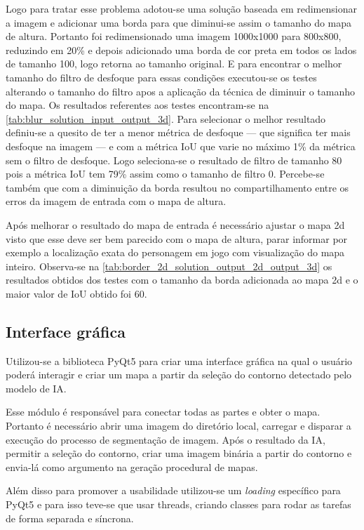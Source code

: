 Logo para tratar esse problema adotou-se uma solução baseada em redimensionar a imagem e adicionar uma borda para que diminui-se assim o tamanho do mapa de altura. Portanto foi redimensionado uma imagem 1000x1000 para 800x800, reduzindo em 20\% e depois adicionado uma borda de cor preta em todos os lados de tamanho 100, logo retorna ao tamanho original. E para encontrar o melhor tamanho do filtro de desfoque para essas condições executou-se os testes alterando o tamanho do filtro apos a aplicação da técnica de diminuir o tamanho do mapa. Os resultados referentes aos testes encontram-se na \cref{tab:blur_solution_input_output_3d}. Para selecionar o melhor resultado definiu-se a quesito de ter a menor métrica de desfoque — que significa ter mais desfoque na imagem — e com a métrica IoU que varie no máximo 1\% da métrica sem o filtro de desfoque. Logo seleciona-se o resultado de filtro de tamanho 80 pois a métrica IoU tem 79\% assim como o tamanho de filtro 0. Percebe-se também que com a diminuição da borda resultou no compartilhamento entre os erros da imagem de entrada com o mapa de altura.



Após melhorar o resultado do mapa de entrada é necessário ajustar o mapa 2d visto que esse deve ser bem parecido com o mapa de altura, parar informar por exemplo a localização exata do personagem em jogo com visualização do mapa inteiro. Observa-se na \cref{tab:border_2d_solution_output_2d_output_3d} os resultados obtidos dos testes com o tamanho da borda adicionada ao mapa 2d e o maior valor de IoU obtido foi 60.



\subsection{Interface gráfica}

Utilizou-se a biblioteca PyQt5 para criar uma interface gráfica na qual o usuário poderá interagir e criar um mapa a partir da seleção do contorno detectado pelo modelo de IA.

Esse módulo é responsável para conectar todas as partes e obter o mapa. Portanto é necessário abrir uma imagem do diretório local, carregar e disparar a execução do processo de segmentação de imagem. Após o resultado da IA, permitir a seleção do contorno,  criar uma imagem binária a partir do contorno e envia-lá como argumento na geração procedural de mapas.

Além disso para promover a usabilidade utilizou-se um \textit{loading} específico para PyQt5 e para isso teve-se que usar threads, criando classes para rodar as tarefas de forma separada e síncrona.